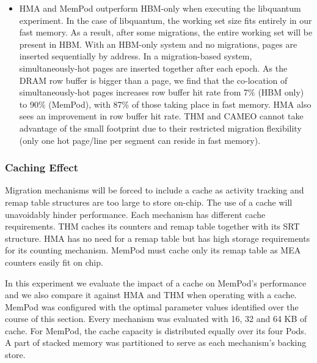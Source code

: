 \begin{itemize}
	\item HMA and MemPod outperform HBM-only when executing the libquantum experiment. In the case of libquantum, the working set size fits entirely in our fast memory. As a result, after some migrations, the entire working set will be present in HBM.  With an HBM-only system and no migrations, pages
are inserted sequentially by address.  In a migration-based system, 
simultaneously-hot pages are inserted together after each epoch.  As the
DRAM row buffer is bigger than a page, we find that the co-location of
simultaneously-hot pages increases row buffer hit rate from 7\% (HBM only)
to 90\% (MemPod), with 87\% of those taking place in fast memory.  HMA also sees an improvement in row buffer hit rate. THM and CAMEO cannot take advantage of the small footprint due to their restricted migration flexibility (only one hot page/line per segment can reside in fast memory).
\end{itemize}

\subsubsection{Caching Effect}

Migration mechanisms will be forced to include a cache as activity tracking and remap table structures are too large to store on-chip. The use of a cache will unavoidably hinder performance. Each mechanism has different cache requirements. THM caches its counters and remap table together with its SRT structure. HMA has no need for a remap table but has high storage requirements for its counting mechanism. MemPod must cache only its remap table as MEA counters easily fit on chip. 

In this experiment we evaluate the impact of a cache on MemPod's performance and we also compare it against HMA and THM when operating with a cache. MemPod was configured with the optimal parameter values identified over the course of this section. Every mechanism was evaluated with 16, 32 and 64 KB of cache. For MemPod, the cache capacity is distributed equally over its four Pods. A part of stacked memory was partitioned to serve as each mechanism's backing store.

